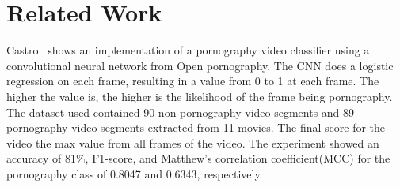 \section{Related Work}
\label{sec:related}


Castro~\cite{torres2018automatic} shows an implementation of a pornography video classifier using a convolutional neural network from Open pornography\cite{mahadeokar2016open}.
The CNN does a logistic regression on each frame, resulting in a value from 0 to 1 at each frame.
The higher the value is, the higher is the likelihood of the frame being pornography.
The dataset used contained 90 non-pornography video segments and 89 pornography video segments extracted from 11 movies.
The final score for the video the max value from all frames of the video.
The experiment showed an accuracy of 81\%, F1-score, and Matthew’s correlation coefficient(MCC) for the pornography class of 0.8047 and 0.6343, respectively.

